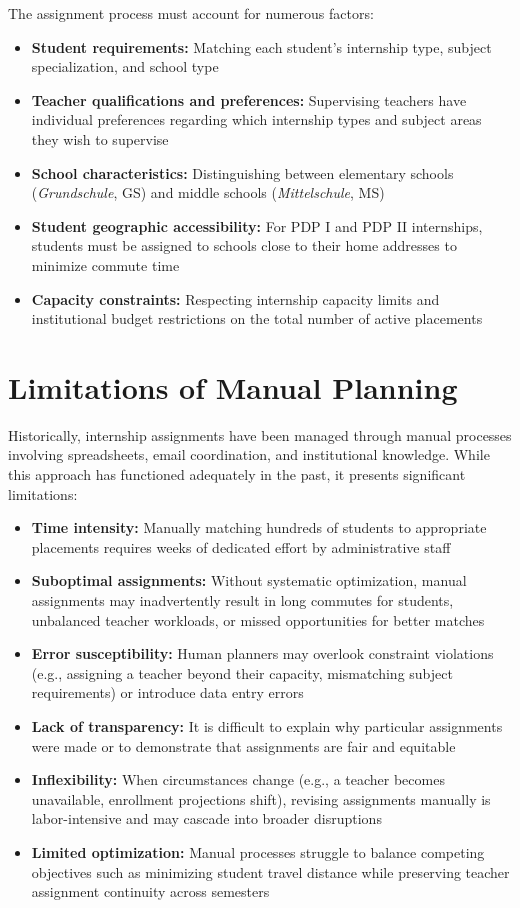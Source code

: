 \documentclass[12pt,a4paper]{report}
\begin{document}
The assignment process must account for numerous factors:
\begin{itemize}
    \item \textbf{Student requirements:} Matching each student's internship type, subject specialization, and school type
    \item \textbf{Teacher qualifications and preferences:} Supervising teachers have individual preferences regarding which internship types and subject areas they wish to supervise
    \item \textbf{School characteristics:} Distinguishing between elementary schools (\textit{Grundschule}, GS) and middle schools (\textit{Mittelschule}, MS)
    \item \textbf{Student geographic accessibility:} For PDP I and PDP II internships, students must be assigned to schools close to their home addresses to minimize commute time
    \item \textbf{Capacity constraints:} Respecting internship capacity limits and institutional budget restrictions on the total number of active placements
\end{itemize}

\section{Limitations of Manual Planning}

Historically, internship assignments have been managed through manual processes involving spreadsheets, email coordination, and institutional knowledge. While this approach has functioned adequately in the past, it presents significant limitations:

\begin{itemize}
    \item \textbf{Time intensity:} Manually matching hundreds of students to appropriate placements requires weeks of dedicated effort by administrative staff
    \item \textbf{Suboptimal assignments:} Without systematic optimization, manual assignments may inadvertently result in long commutes for students, unbalanced teacher workloads, or missed opportunities for better matches
    \item \textbf{Error susceptibility:} Human planners may overlook constraint violations (e.g., assigning a teacher beyond their capacity, mismatching subject requirements) or introduce data entry errors
    \item \textbf{Lack of transparency:} It is difficult to explain why particular assignments were made or to demonstrate that assignments are fair and equitable
    \item \textbf{Inflexibility:} When circumstances change (e.g., a teacher becomes unavailable, enrollment projections shift), revising assignments manually is labor-intensive and may cascade into broader disruptions
    \item \textbf{Limited optimization:} Manual processes struggle to balance competing objectives such as minimizing student travel distance while preserving teacher assignment continuity across semesters
\end{itemize}
\end{document}
